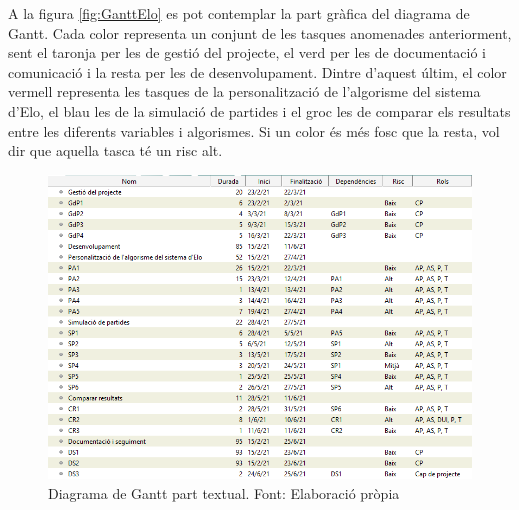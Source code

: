 \documentclass[a4paper]{article}
\begin{document}
A la figura \ref{fig:GanttElo} es pot contemplar la part gràfica del diagrama de Gantt. Cada color representa un conjunt de les tasques anomenades anteriorment, sent el taronja per les de gestió del projecte, el verd per les de documentació i comunicació i la resta per les de desenvolupament. Dintre d'aquest últim, el color vermell representa les tasques de la personalització de l’algorisme del sistema d’Elo, el blau les de la simulació de partides i el groc les de comparar els resultats entre les diferents variables i algorismes. Si un color és més fosc que la resta, vol dir que aquella tasca té un risc alt.

\begin{figure}[H]
    \centering
    \includegraphics[width=1.15\textwidth]{images/GantEloEscrit.png}
    \caption[Diagrama de Gantt part textual]{Diagrama de Gantt part textual. Font: Elaboració pròpia}
    \label{fig:GanttText}
\end{figure}
 \newpage
\end{document}
